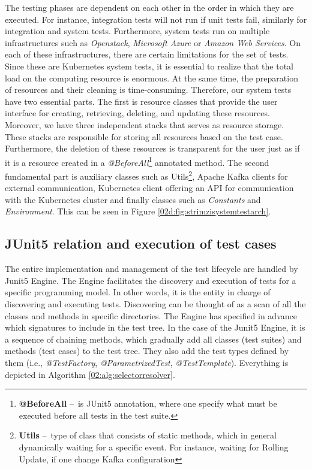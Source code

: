 The testing phases are dependent on each other in the order in which they are executed.
For instance, integration tests will not run if unit tests fail, similarly for integration and system tests.
Furthermore, system tests run on multiple infrastructures such as \emph{Openstack}, \emph{Microsoft Azure} or \emph{Amazon Web Services}.
On each of these infrastructures, there are certain limitations for the set of tests.
Since these are Kubernetes system tests, it is essential to realize that the total load on the computing resource is enormous.
At the same time, the preparation of resources and their cleaning is time-consuming.
Therefore, our system tests have two essential parts.
The first is resource classes that provide the user interface for creating, retrieving, deleting, and updating these resources.
Moreover, we have three independent stacks that serves as resource storage.
These stacks are responsible for storing all resources based on the test case.
Furthermore, the deletion of these resources is transparent for the user just as if it is a resource created in a \emph{@BeforeAll}\footnote{\textbf{@BeforeAll } \---\ is JUnit5 annotation, where one specify what must be executed before all tests in the test suite.} annotated method.
The second fundamental part is auxiliary classes such as Utils\footnote {\textbf{Utils} \---\ type of class that consists of static methods, which in general dynamically waiting for a specific event. For instance, waiting for Rolling Update, if one change Kafka configuration}, Apache Kafka clients for external communication, Kubernetes client offering an API for communication with the Kubernetes cluster and finally classes such as \emph{Constants} and \emph{Environment}. This can be seen in Figure \ref{02d:fig:strimzisystemtestarch}.

\subsection{JUnit5 relation and execution of test cases}
\label{02:subsec:strimziJunit5relation:execution}

The entire implementation and management of the test lifecycle are handled by Junit5 Engine.
The Engine facilitates the discovery and execution of tests for a specific programming model.
In other words, it is the entity in charge of discovering and executing tests.
Discovering can be thought of as a scan of all the classes and methods in specific directories.
The Engine has specified in advance which signatures to include in the test tree.
In the case of the Junit5 Engine, it is a sequence of chaining methods, which gradually add all classes (test suites) and methods (test cases) to the test tree.
They also add the test types defined by them (i.e., \emph{@TestFactory}, \emph{@ParametrizedTest}, \emph{@TestTemplate}).
Everything is depicted in Algorithm \ref{02:alg:selectorresolver}.


